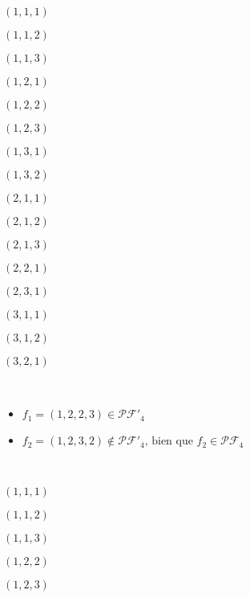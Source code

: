 \begin{example}[Théorème 2 : $n = 3 : pf_3 = 16$]
    ~\\
    \begin{itemize*}             
        \item $(1, 1, 1)$
        \item $(1, 1, 2)$
        \item $(1, 1, 3)$
        \item $(1, 2, 1)$
        \item $(1, 2, 2)$
        \item $(1, 2, 3)$
        \item $(1, 3, 1)$
        \item $(1, 3, 2)$
        \item $(2, 1, 1)$
        \item $(2, 1, 2)$
        \item $(2, 1, 3)$
        \item $(2, 2, 1)$
        \item $(2, 3, 1)$
        \item $(3, 1, 1)$
        \item $(3, 1, 2)$
        \item $(3, 2, 1)$
    \end{itemize*}
\end{example}

\begin{example}[Définition 3 : $n = 4$]
    ~
    \begin{itemize}
        \item $f_1 = (1, 2, 2, 3) \in \mathcal{PF'}_4$
        \item $f_2 = (1, 2, 3, 2) \notin \mathcal{PF'}_4
         \text{, bien que } f_2 \in \mathcal{PF}_4$
    \end{itemize}
\end{example}

\begin{example}[Théorème 4 : $n = 3 : pf'_3 = 5$]
    ~\\
    \begin{itemize*}
        \item $(1, 1, 1)$
        \item $(1, 1, 2)$
        \item $(1, 1, 3)$
        \item $(1, 2, 2)$
        \item $(1, 2, 3)$
    \end{itemize*}
\end{example}

